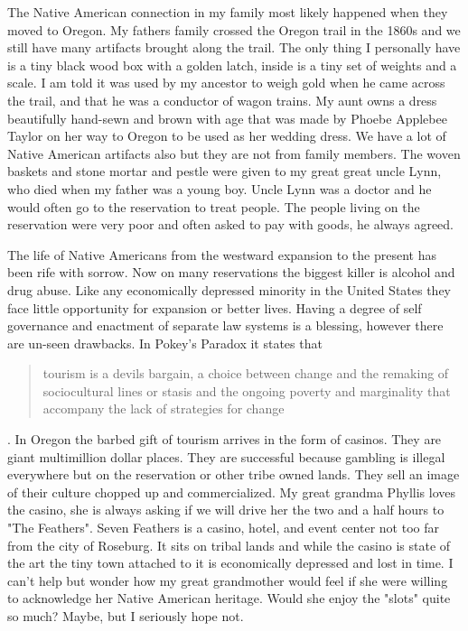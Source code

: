 \documentclass[
    a4paper,
    12pt,
    man,
    donotrepeattitle
]{apa6}
\let \cite \parencite
\begin{document}
The Native American connection in my family most likely happened when they
moved to Oregon. My fathers family crossed the Oregon trail in the 1860s and we
still have many artifacts brought along the trail. The only thing I personally
have is a tiny black wood box with a golden latch, inside is a tiny set of
weights and a scale. I am told it was used by my ancestor to weigh gold when he
came across the trail, and that he was a conductor of wagon trains. My aunt
owns a dress beautifully hand-sewn and brown with age that was made by Phoebe
Applebee Taylor on her way to Oregon to be used as her wedding dress. We have
a lot of Native American artifacts also but they are not from family members.
The woven baskets and stone mortar and pestle were given to my great great
uncle Lynn, who died when my father was a young boy. Uncle Lynn was a doctor
and he would often go to the reservation to treat people. The people living on
the reservation were very poor and often asked to pay with goods, he always
agreed.

The life of Native Americans from the westward expansion to the present has
been rife with sorrow. Now on many reservations the biggest killer is alcohol
and drug abuse. Like any economically depressed minority in the United States
they face little opportunity for expansion or better lives. Having a degree of
self governance and enactment of separate law systems is a blessing, however
there are un-seen drawbacks. In Pokey's Paradox it states that 
\blockquote{tourism is a devils
bargain, a choice between change and the remaking of sociocultural lines or
stasis and the ongoing poverty and marginality that accompany the lack of
strategies for change} \cite[p. 93]{s11}. In Oregon the barbed gift of tourism 
arrives in
the form of casinos. They are giant multimillion dollar places. They are
successful because gambling is illegal everywhere but on the reservation or
other tribe owned lands. They sell an image of their culture chopped up and
commercialized. My great grandma Phyllis loves the casino, she is always asking
if we will drive her the two and a half hours to "The Feathers". Seven Feathers
is a casino, hotel, and event center not too far from the city of Roseburg. It
sits on tribal lands and while the casino is state of the art the tiny town
attached to it is economically depressed and lost in time. I can't help but
wonder how my great grandmother would feel if she were willing to acknowledge
her Native American heritage. Would she enjoy the "slots" quite so much? Maybe,
but I seriously hope not.
\end{document}
